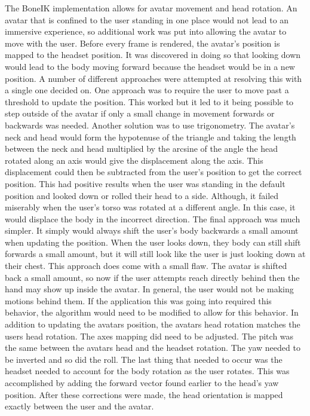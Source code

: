 \documentclass{vgtc}                          %
\begin{document}
The BoneIK implementation allows for avatar movement and head rotation. An avatar that is confined to the user standing in one place would not lead to an immersive experience, so additional work was put into allowing the avatar to move with the user. Before every frame is rendered, the avatar’s position is mapped to the headset position. It was discovered in doing so that looking down would lead to the body moving forward because the headset would be in a new position. A number of different approaches were attempted at resolving this with a single one decided on. One approach was to require the user to move past a threshold to update the position. This worked but it led to it being possible to step outside of the avatar if only a small change in movement forwards or backwards was needed. Another solution was to use trigonometry. The avatar’s neck and head would form the hypotenuse of the triangle and taking the length between the neck and head multiplied by the arcsine of the angle the head rotated along an axis would give the displacement along the axis. This displacement could then be subtracted from the user’s position to get the correct position. This had positive results when the user was standing in the default position and looked down or rolled their head to a side. Although, it failed miserably when the user’s torso was rotated at a different angle. In this case, it would displace the body in the incorrect direction. The final approach was much simpler. It simply would always shift the user’s body backwards a small amount when updating the position. When the user looks down, they body can still shift forwards a small amount, but it will still look like the user is just looking down at their chest. This approach does come with a small flaw. The avatar is shifted back a small amount, so now if the user attempts reach directly behind then the hand may show up inside the avatar. In general, the user would not be making motions behind them. If the application this was going into required this behavior, the algorithm would need to be modified to allow for this behavior. In addition to updating the avatars position, the avatars head rotation matches the users head rotation. The axes mapping did need to be adjusted. The pitch was the same between the avatars head and the headset rotation. The yaw needed to be inverted and so did the roll. The last thing that needed to occur was the headset needed to account for the body rotation as the user rotates. This was accomplished by adding the forward vector found earlier to the head’s yaw position. After these corrections were made, the head orientation is mapped exactly between the user and the avatar. 
\end{document}
